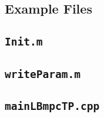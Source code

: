 \documentclass[letter]{article}
\begin{document}
\begin{sffamily}
\newpage
\section{Example Files}
\subsection{\texttt{Init.m}} \label{app: Init.m}
\lstset{language=Matlab}


\subsection{\texttt{writeParam.m}} \label{app: writeParam.m}
\lstset{language=Matlab}


\newpage
\subsection{ \texttt{mainLBmpcTP.cpp}} \label{app: mainLBmpcTP.cpp}
\lstset{language=C}




\end{sffamily}		%



\end{document}
